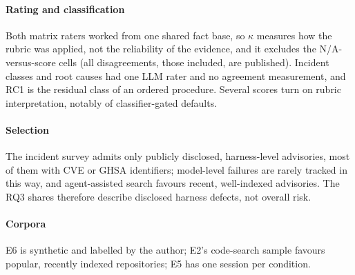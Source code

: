 \paragraph*{Rating and classification} Both matrix raters worked from one shared fact base, so $\kappa$ measures how the rubric was applied, not the reliability of the evidence, and it excludes the N/A-versus-score cells (all \nDisagreeEOne{} disagreements, those included, are published). Incident classes and root causes had one LLM rater and no agreement measurement, and RC1 is the residual class of an ordered procedure. Several scores turn on rubric interpretation, notably of classifier-gated defaults.

\paragraph*{Selection} The incident survey admits only publicly disclosed, harness-level advisories, most of them with CVE or GHSA identifiers; model-level failures are rarely tracked in this way, and agent-assisted search favours recent, well-indexed advisories. The RQ3 shares therefore describe disclosed harness defects, not overall risk.

\paragraph*{Corpora} E6 is synthetic and labelled by the author; E2's code-search sample favours popular, recently indexed repositories; E5 has one session per condition.
